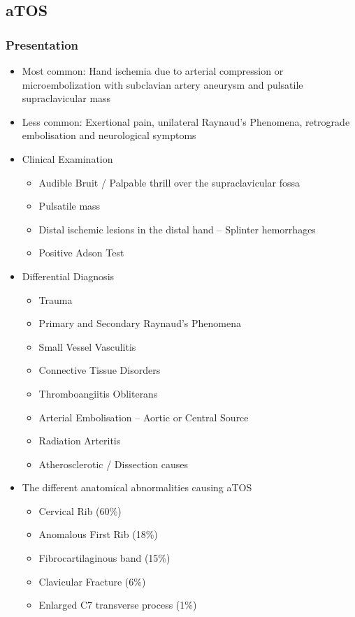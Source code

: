 \documentclass[
]{book}
\begin{document}
\hypertarget{atos}{%
\subsection{aTOS}\label{atos}}

\hypertarget{presentation-1}{%
\subsubsection{Presentation}\label{presentation-1}}

\begin{itemize}
\item
  Most common: Hand ischemia due to arterial compression or
  microembolization with subclavian artery aneurysm and pulsatile
  supraclavicular mass \citep{boll122ThoracicOutlet2019}
\item
  Less common: Exertional pain, unilateral Raynaud's Phenomena,
  retrograde embolisation and neurological symptoms~
\item
  Clinical Examination

  \begin{itemize}
  \item
    Audible Bruit / Palpable thrill over the supraclavicular fossa
  \item
    Pulsatile mass
  \item
    Distal ischemic lesions in the distal hand -- Splinter
    hemorrhages
  \item
    Positive Adson Test
  \end{itemize}
\item
  Differential Diagnosis

  \begin{itemize}
  \item
    Trauma
  \item
    Primary and Secondary Raynaud's Phenomena
  \item
    Small Vessel Vasculitis
  \item
    Connective Tissue Disorders
  \item
    Thromboangiitis Obliterans
  \item
    Arterial Embolisation -- Aortic or Central Source
  \item
    Radiation Arteritis
  \item
    Atherosclerotic / Dissection causes
  \end{itemize}
\item
  The different anatomical abnormalities causing aTOS
  \citep{boll122ThoracicOutlet2019}

  \begin{itemize}
  \item
    Cervical Rib (60\%)
  \item
    Anomalous First Rib (18\%)
  \item
    Fibrocartilaginous band (15\%)
  \item
    Clavicular Fracture (6\%)
  \item
    Enlarged C7 transverse process (1\%)
  \end{itemize}
\end{itemize}
\end{document}

